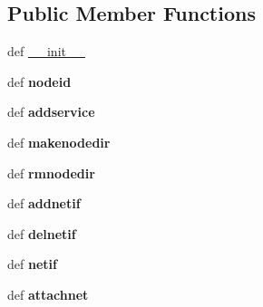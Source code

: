 \subsection*{Public Member Functions}
\begin{DoxyCompactItemize}
\item 
def \hyperlink{classcore_1_1coreobj_1_1_py_core_node_a7d4b665f6f61ca63e1eaec931f9fbccf}{\+\_\+\+\_\+init\+\_\+\+\_\+}
\item 
\hypertarget{classcore_1_1coreobj_1_1_py_core_node_ad92c9f24d0fae815acc2aa767610a67d}{def {\bfseries nodeid}}\label{classcore_1_1coreobj_1_1_py_core_node_ad92c9f24d0fae815acc2aa767610a67d}

\item 
\hypertarget{classcore_1_1coreobj_1_1_py_core_node_aea6c0f8ede2d51c9351f4f3ac23fa923}{def {\bfseries addservice}}\label{classcore_1_1coreobj_1_1_py_core_node_aea6c0f8ede2d51c9351f4f3ac23fa923}

\item 
\hypertarget{classcore_1_1coreobj_1_1_py_core_node_a03d239a15c0d43aacf0e329fb5b23be1}{def {\bfseries makenodedir}}\label{classcore_1_1coreobj_1_1_py_core_node_a03d239a15c0d43aacf0e329fb5b23be1}

\item 
\hypertarget{classcore_1_1coreobj_1_1_py_core_node_ae089e3248064c94826a3a8cb40428624}{def {\bfseries rmnodedir}}\label{classcore_1_1coreobj_1_1_py_core_node_ae089e3248064c94826a3a8cb40428624}

\item 
\hypertarget{classcore_1_1coreobj_1_1_py_core_node_a22c9f596e7ae03727b7836fbba80457d}{def {\bfseries addnetif}}\label{classcore_1_1coreobj_1_1_py_core_node_a22c9f596e7ae03727b7836fbba80457d}

\item 
\hypertarget{classcore_1_1coreobj_1_1_py_core_node_a917085ccd3b2c924bfabc25fc8370147}{def {\bfseries delnetif}}\label{classcore_1_1coreobj_1_1_py_core_node_a917085ccd3b2c924bfabc25fc8370147}

\item 
\hypertarget{classcore_1_1coreobj_1_1_py_core_node_a35c2854d9cc95df5288c957439ab0ddd}{def {\bfseries netif}}\label{classcore_1_1coreobj_1_1_py_core_node_a35c2854d9cc95df5288c957439ab0ddd}

\item 
\hypertarget{classcore_1_1coreobj_1_1_py_core_node_a68d27b52c84f69fafe429bfa2cc3a1c5}{def {\bfseries attachnet}}\label{classcore_1_1coreobj_1_1_py_core_node_a68d27b52c84f69fafe429bfa2cc3a1c5}


\end{DoxyCompactItemize}
